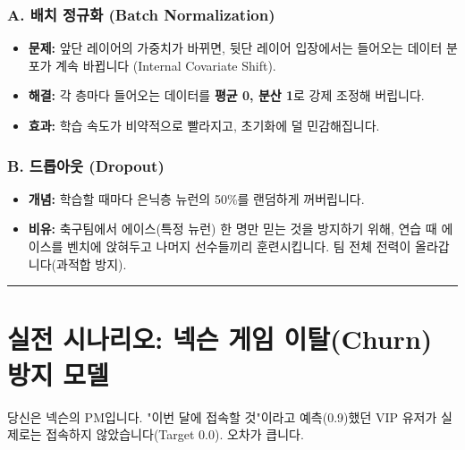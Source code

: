 \documentclass[11pt,a4paper]{book}
\theoremstyle{definition}
\begin{document}
\subsubsection*{A. 배치 정규화 (Batch Normalization)}
\begin{itemize}
    \item \textbf{문제:} 앞단 레이어의 가중치가 바뀌면, 뒷단 레이어 입장에서는 들어오는 데이터 분포가 계속 바뀝니다 (Internal Covariate Shift).
    \item \textbf{해결:} 각 층마다 들어오는 데이터를 \textbf{평균 0, 분산 1}로 강제 조정해 버립니다.
    \item \textbf{효과:} 학습 속도가 비약적으로 빨라지고, 초기화에 덜 민감해집니다.
\end{itemize}

\subsubsection*{B. 드롭아웃 (Dropout)}
\begin{itemize}
    \item \textbf{개념:} 학습할 때마다 은닉층 뉴런의 50\%를 랜덤하게 꺼버립니다.
    \item \textbf{비유:} 축구팀에서 에이스(특정 뉴런) 한 명만 믿는 것을 방지하기 위해, 연습 때 에이스를 벤치에 앉혀두고 나머지 선수들끼리 훈련시킵니다. 팀 전체 전력이 올라갑니다(과적합 방지).
\end{itemize}

\vspace{0.5cm}\hrule\vspace{0.5cm}

\section{실전 시나리오: 넥슨 게임 이탈(Churn) 방지 모델}

\begin{storybox}[title={Scenario: VIP 유저가 떠나는 이유 찾기}]
당신은 넥슨의 PM입니다. "이번 달에 접속할 것"이라고 예측(0.9)했던 VIP 유저가 실제로는 접속하지 않았습니다(Target 0.0). 오차가 큽니다.
\end{storybox}
\end{document}
